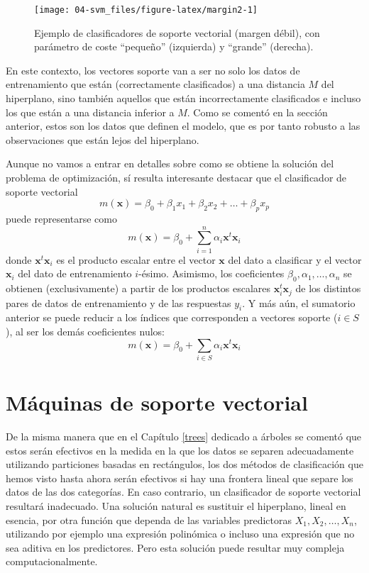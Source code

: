 \documentclass[
]{book}
\theoremstyle{break}
\theoremstyle{nonumberplain}
\begin{document}
\begin{figure}[!htb]

{\centering \texttt{[image: 04-svm\_files/figure-latex/margin2-1]} 

}

\caption{Ejemplo de clasificadores de soporte vectorial (margen débil), con parámetro de coste ``pequeño'' (izquierda) y ``grande'' (derecha).}\label{fig:margin2}
\end{figure}

En este contexto, los vectores soporte van a ser no solo los datos de entrenamiento que están (correctamente clasificados) a una distancia \(M\) del hiperplano, sino también aquellos que están incorrectamente clasificados e incluso los que están a una distancia inferior a \(M\). Como se comentó en la sección anterior, estos son los datos que definen el modelo, que es por tanto robusto a las observaciones que están lejos del hiperplano.

Aunque no vamos a entrar en detalles sobre como se obtiene la solución del problema de optimización, sí resulta interesante destacar que el clasificador de soporte vectorial
\[m(\mathbf{x}) = \beta_0 + \beta_1 x_1 + \beta_2 x_2 + \ldots + \beta_p x_p\]
puede representarse como
\[m(\mathbf{x}) = \beta_0 + \sum_{i=1}^n \alpha_i \mathbf{x}^t \mathbf{x}_i\]
donde \(\mathbf{x}^t \mathbf{x}_i\) es el producto escalar entre el vector \(\mathbf{x}\) del dato a clasificar y el vector \(\mathbf{x}_i\) del dato de entrenamiento \(i\)-ésimo. Asimismo, los coeficientes \(\beta_0, \alpha_1, \ldots, \alpha_n\) se obtienen (exclusivamente) a partir de los productos escalares \(\mathbf{x}_i^t \mathbf{x}_j\) de los distintos pares de datos de entrenamiento y de las respuestas \(y_i\). Y más aún, el sumatorio anterior se puede reducir a los índices que corresponden a vectores soporte (\(i\in S\)), al ser los demás coeficientes nulos:
\[m(\mathbf{x}) = \beta_0 + \sum_{i\in S} \alpha_i \mathbf{x}^t \mathbf{x}_i\]

\hypertarget{muxe1quinas-de-soporte-vectorial}{%
\section{Máquinas de soporte vectorial}\label{muxe1quinas-de-soporte-vectorial}}

De la misma manera que en el Capítulo \ref{trees} dedicado a árboles se comentó que estos serán efectivos en la medida en la que los datos se separen adecuadamente utilizando particiones basadas en rectángulos, los dos métodos de clasificación que hemos visto hasta ahora serán efectivos si hay una frontera lineal que separe los datos de las dos categorías. En caso contrario, un clasificador de soporte vectorial resultará inadecuado. Una solución natural es sustituir el hiperplano, lineal en esencia, por otra función que dependa de las variables predictoras \(X_1,X_2, \ldots, X_n\), utilizando por ejemplo una expresión polinómica o incluso una expresión que no sea aditiva en los predictores. Pero esta solución puede resultar muy compleja computacionalmente.
\end{document}
